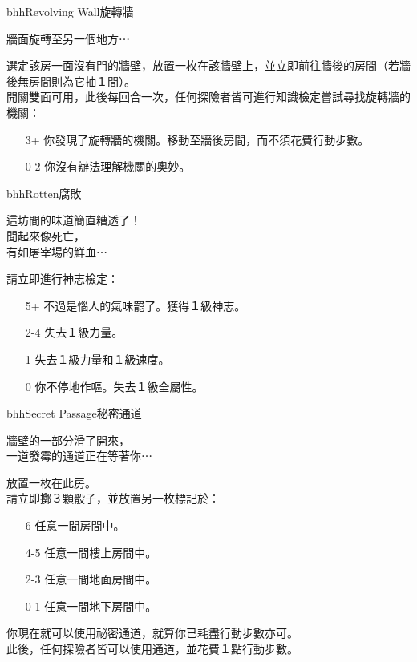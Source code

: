 \linebreak[0]%
\begin{EventCard}{bhh}{Revolving Wall}{旋轉牆}
  \begin{CardStory}
    牆面旋轉至另一個地方⋯
  \end{CardStory}
  選定該房一面沒有門的牆壁，放置一枚在該牆壁上，並立即前往牆後的房間（若牆後無房間則為它抽１間）。\\[0.5em]
  開關雙面可用，此後每回合一次，任何探險者皆可進行知識檢定嘗試尋找旋轉牆的機關：
  \begin{itemize}
    \item[3+] 你發現了旋轉牆的機關。移動至牆後房間，而不須花費行動步數。
    \item[0-2] 你沒有辦法理解機關的奧妙。
  \end{itemize}
\end{EventCard}%
\linebreak[0]%
\begin{EventCard}{bhh}{Rotten}{腐敗}
  \begin{CardStory}
    這坊間的味道簡直糟透了！\\
    聞起來像死亡，\\
    有如屠宰場的鮮血⋯
  \end{CardStory}
  請立即進行神志檢定：
  \begin{itemize}
    \item[5+] 不過是惱人的氣味罷了。獲得１級神志。
    \item[2-4] 失去１級力量。
    \item[1] 失去１級力量和１級速度。
    \item[0] 你不停地作嘔。失去１級全屬性。
  \end{itemize}
\end{EventCard}%
\linebreak[0]%
\begin{EventCard}{bhh}{Secret Passage}{秘密通道}
  \begin{CardStory}
    牆壁的一部分滑了開來，\\
    一道發霉的通道正在等著你⋯
  \end{CardStory}
  放置一枚在此房。\\[0.5em]
  請立即擲３顆骰子，並放置另一枚標記於：
  \begin{itemize}
    \item[6] 任意一間房間中。
    \item[4-5] 任意一間樓上房間中。
    \item[2-3] 任意一間地面房間中。
    \item[0-1] 任意一間地下房間中。
  \end{itemize}
  你現在就可以使用祕密通道，就算你已耗盡行動步數亦可。\\[0.5em]
  此後，任何探險者皆可以使用通道，並花費１點行動步數。\\[0.5em]
\end{EventCard}%
